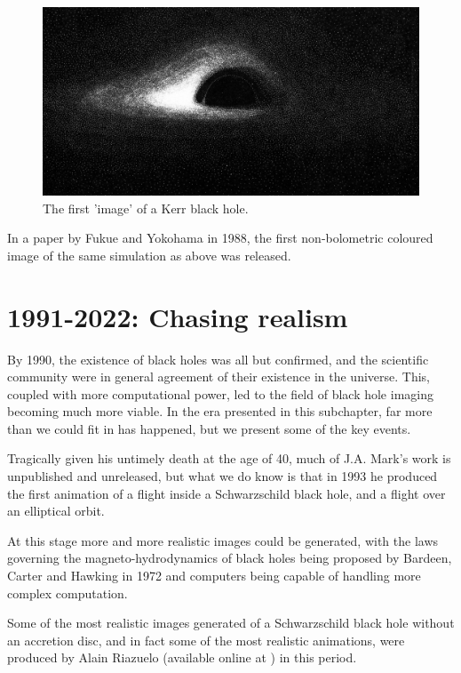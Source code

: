 \documentclass[oneside,openright,frontopenright, singlespacing]{dmathesis}
\begin{document}
\begin{figure}[!ht]
	\centering
	\includegraphics[width=0.5\linewidth]{img/Luminet-drawing}
	\caption{The first 'image' of a Kerr black hole. \cite{luminet1979image}}
	\label{fig:Figure1.2}
\end{figure}

\vspace{1em}
	In a paper by Fukue and Yokohama in 1988, the first non-bolometric coloured image of the same simulation as above was released\cite{fukue1988color}.

\section{1991-2022: Chasing realism}\label{sec:Section1.3}

	By 1990, the existence of black holes was all but confirmed, and the scientific community were in general agreement of their existence in the universe. This, coupled with more computational power, led to the field of black hole imaging becoming much more viable. In the era presented in this subchapter, far more than we could fit in has happened, but we present some of the key events.

\vspace{1em}
	Tragically given his untimely death at the age of 40, much of J.A. Mark's work is unpublished and unreleased, but what we do know is that in 1993 he produced the first animation of a flight inside a Schwarzschild black hole, and a flight over an elliptical orbit\cite{InfinitelyCurved}.

\vspace{1em}
	At this stage more and more realistic images could be generated, with the laws governing the magneto-hydrodynamics of black holes being proposed by Bardeen, Carter and Hawking in 1972\cite{bardeen1973four} and computers being capable of handling more complex computation.

\vspace{1em}
	Some of the most realistic images generated of a Schwarzschild black hole without an accretion disc, and in fact some of the most realistic animations, were produced by Alain Riazuelo (available online at \cite{riazuelo2014black}) in this period.
\end{document}
